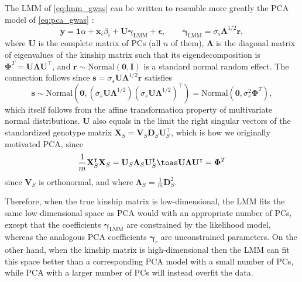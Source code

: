 \documentclass[11pt]{article}
\begin{document}
The LMM of \cref{eq:lmm_gwas} can be written to resemble more greatly the PCA model of \cref{eq:pca_gwas} \citep{astle_population_2009, hoffman_correcting_2013}:
\begin{equation}
  \label{eq:lmm_gwas_evd}
  \mathbf{y}
  =
  \mathbf{1} \alpha + \mathbf{x}_i \beta_i + \mathbf{U} \boldsymbol{\gamma}_\text{LMM} + \boldsymbol{\epsilon}
  , \quad\quad
  \boldsymbol{\gamma}_\text{LMM} = \sigma_s \boldsymbol{\Lambda}^{1/2} \mathbf{r}
  ,
\end{equation}
where $\mathbf{U}$ is the complete matrix of PCs (all $n$ of them), $\boldsymbol{\Lambda}$ is the diagonal matrix of eigenvalues of the kinship matrix such that its eigendecomposition is $\mathbf{\Phi}^T = \mathbf{U} \boldsymbol{\Lambda} \mathbf{U}^\intercal$, and $\mathbf{r} \sim \text{Normal}(\mathbf{0},\mathbf{I})$ is a standard normal random effect.
The connection follows since $\mathbf{s} = \sigma_s \mathbf{U} \boldsymbol{\Lambda}^{1/2} \mathbf{r}$ satisfies
$$
\mathbf{s} \sim \text{Normal} \left( \mathbf{0}, \left( \sigma_s \mathbf{U} \boldsymbol{\Lambda}^{1/2} \right) \left( \sigma_s \mathbf{U} \boldsymbol{\Lambda}^{1/2} \right)^\intercal \right)
= \text{Normal}( \mathbf{0}, \sigma_s^2 \mathbf{\Phi}^T ),
$$
which itself follows from the affine transformation property of multivariate normal distributions.
$\mathbf{U}$ also equals in the limit the right singular vectors of the standardized genotype matrix $\mathbf{X}_S = \mathbf{V}_S \mathbf{D}_S \mathbf{U}_S^\intercal$, which is how we originally motivated PCA, since
$$
\frac{1}{m} \mathbf{X}_S^\intercal \mathbf{X}_S
= \mathbf{U}_S \mathbf{\Lambda}_S \mathbf{U}_S^\intercal
\toas
\mathbf{U} \mathbf{\Lambda} \mathbf{U}^\intercal
=
\mathbf{\Phi}^T
$$
since $\mathbf{V}_S$ is orthonormal, and where $\mathbf{\Lambda}_S = \frac{1}{m} \mathbf{D}_S^2$.

Therefore, when the true kinship matrix is low-dimensional, the LMM fits the same low-dimensional space as PCA would with an appropriate number of PCs, except that the coefficients $\boldsymbol{\gamma}_\text{LMM}$ are constrained by the likelihood model, whereas the analogous PCA coefficients $\boldsymbol{\gamma}_r$ are unconstrained parameters.
On the other hand, when the kinship matrix is high-dimensional then the LMM can fit this space better than a corresponding PCA model with a small number of PCs, while PCA with a larger number of PCs will instead overfit the data.
\end{document}
